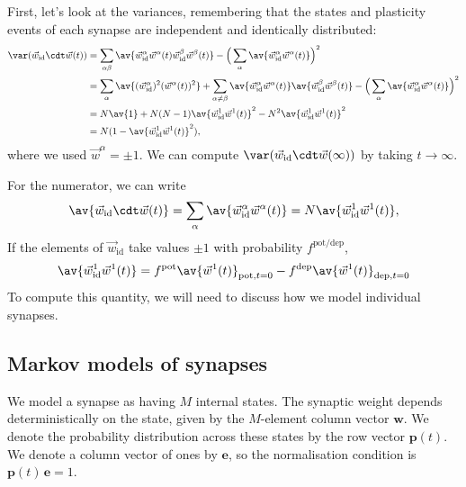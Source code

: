 \documentclass[12pt]{article}
\newcommand{\onev}{\mathbf{e}}
\newcommand{\prm}{p}
\newcommand{\pr}{\mathbf{\prm}}
\newcommand{\wm}{w}
\newcommand{\w}{\mathbf{\wm}}
\newcommand{\pot}{^{\text{pot}}}
\newcommand{\dep}{^{\text{dep}}}
\newcommand{\potdep}{^{\text{pot/dep}}}
\newcommand{\syn}{\vec{w}}
\newcommand{\synid}{\syn_\text{id}}
\begin{document}
First, let's look at the variances, remembering that the states and plasticity events of each synapse are independent and identically distributed:
%
\begin{equation}\label{eq:noise}
\begin{aligned}
  \var(\synid\cdt\syn(t))
    &= \sum_{\alpha\beta} \av{\synid^\alpha \syn^\alpha(t) \synid^\beta \syn^\beta(t)}
    - \Big(\sum_{\alpha} \av{\synid^\alpha \syn^\alpha(t)} \Big)^2 \\
    &= \sum_{\alpha} \av{(\synid^\alpha)^2(\syn^\alpha(t))^2}
    + \sum_{\alpha\neq\beta} \av{\synid^\alpha\syn^\alpha(t)}\av{\smash{\synid^\beta}\smash{\syn^\beta}(t)}
    - \Big(\sum_{\alpha} \av{\synid^\alpha \syn^\alpha(t)} \Big)^2  \\
    &= N\av{1}
    + N(N-1)\av{\synid^1 \syn^1(t)}^2
    - N^2\av{\synid^1 \syn^1(t)}^2 \\
    &= N(1-\av{\synid^1 \syn^1(t)}^2),
\end{aligned}
\end{equation}
%
where we used $\syn^\alpha=\pm1$.
We can compute $\var(\synid\cdt\syn(\infty))$ by taking $t\to\infty$.

For the numerator, we can write
%
\begin{equation}\label{eq:overlapex}
  \av{\synid\cdt\syn(t)} = \sum_\alpha\av{\synid^\alpha\syn^\alpha(t)}
   = N \av{\synid^1\syn^1(t)},
\end{equation}
%
If the elements of $\synid$ take values $\pm1$ with probability $f\potdep$,
%
\begin{equation}\label{eq:overlapone}
  \av{\synid^1\syn^1(t)} = f\pot \av{\syn^1(t)}_{\text{pot},t=0} - f\dep \av{\syn^1(t)}_{\text{dep},t=0}
\end{equation}
%
To compute this quantity, we will need to discuss how we model individual synapses.



\subsection{Markov models of synapses}\label{sec:markovsynapse}

We model a synapse as having $M$ internal states.
The synaptic weight depends deterministically on the state, given by the $M$-element column vector $\w$.
We denote the probability distribution across these states by the row vector $\pr(t)$.
We denote a column vector of ones by $\onev$, so the normalisation condition is $\pr(t) \, \onev=1$.
\end{document}
